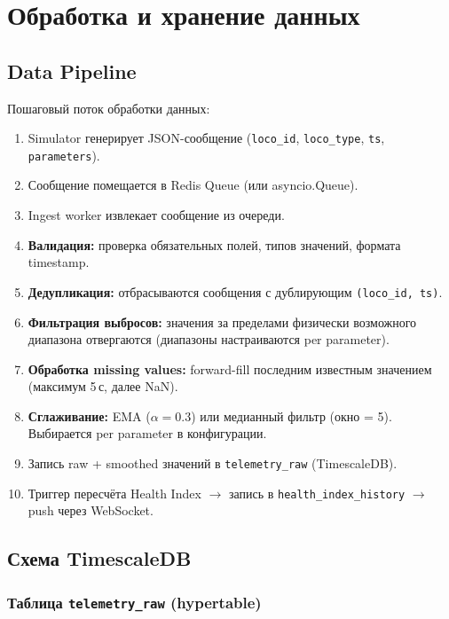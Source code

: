 \documentclass[12pt,a4paper]{article}
\newcommand{\code}[1]{\texttt{#1}}
\begin{document}
\section{Обработка и хранение данных}

\subsection{Data Pipeline}

Пошаговый поток обработки данных:

\begin{enumerate}[nosep]
  \item Simulator генерирует JSON-сообщение (\code{loco\_id}, \code{loco\_type}, \code{ts}, \code{parameters}).
  \item Сообщение помещается в Redis Queue (или asyncio.Queue).
  \item Ingest worker извлекает сообщение из очереди.
  \item \textbf{Валидация:} проверка обязательных полей, типов значений, формата timestamp.
  \item \textbf{Дедупликация:} отбрасываются сообщения с дублирующим \code{(loco\_id, ts)}.
  \item \textbf{Фильтрация выбросов:} значения за пределами физически возможного диапазона отвергаются (диапазоны настраиваются per parameter).
  \item \textbf{Обработка missing values:} forward-fill последним известным значением (максимум 5\,с, далее NaN).
  \item \textbf{Сглаживание:} EMA ($\alpha = 0.3$) или медианный фильтр (окно = 5). Выбирается per parameter в конфигурации.
  \item Запись raw + smoothed значений в \code{telemetry\_raw} (TimescaleDB).
  \item Триггер пересчёта Health Index $\to$ запись в \code{health\_index\_history} $\to$ push через WebSocket.
\end{enumerate}

\subsection{Схема TimescaleDB}
\label{sec:db-schema}

\subsubsection*{Таблица \code{telemetry\_raw} (hypertable)}
\end{document}
